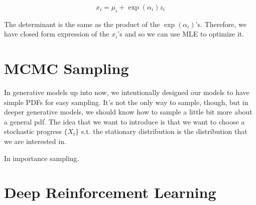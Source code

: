 \documentclass{article}
\theoremstyle{definition}
\theoremstyle{remark}
\theoremstyle{definition}
\begin{document}
      \[x_i = \mu_i + \exp(\alpha_i) z_i\]

    The determinant is the same as the product of the $\exp(\alpha_i)$'s. Therefore, we have closed form expression of the $x_i$'s and so we can use MLE to optimize it.


\section{MCMC Sampling}

  In generative models up into now, we intentionally designed our models to have simple PDFs for easy sampling. It's not the only way to sample, though, but in deeper generative models, we should know how to sample a little bit more about a general pdf. The idea that we want to introduce is that we want to choose a stochastic progress $\{X_t\}$ s.t. the stationary distribution is the distribution that we are interested in.  

  In importance sampling. 


\section{Deep Reinforcement Learning}










\end{document}
